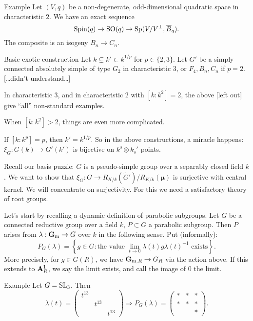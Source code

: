 \begin{enonce}[remark]{Example}
Let $(V,q)$ be a non-degenerate, odd-dimensional quadratic space in characteristic 
$2$. We have an exact sequence 
\[
  \operatorname{Spin}(q) \to \operatorname{SO}(q) \to \operatorname{Sp}(V/V^\bot,\overline B_q) .
\]
The composite is an isogeny $B_n \to C_n$. 
\end{enonce}

\begin{enonce}[remark]{Basic exotic construction}
Let $k\subsetneq k'\subset k^{1/p}$ for $p\in \{2,3\}$. Let 
$G'$ be a simply connected absolutely simple of type $G_2$ in characteristic $3$, 
or $F_4,B_n,C_n$ if $p=2$.
[\ldots didn't understand\ldots]
\end{enonce}

\begin{theo}
In characteristic $3$, and in characteristic $2$ with $[k:k^2]=2$, the above 
[left out] give ``all'' non-standard examples. 
\end{theo}


When $[k:k^2]>2$, things are even more complicated. 

If $[k:k^p]=p$, then $k'=k^{1/p}$. So in the above constructions, a miracle 
happens: $\xi_G:G(k) \to G'(k')$ is bijective on $k^s\otimes k_s'$-points. 

Recall our basis puzzle: $G$ is a pseudo-simple group over a separably closed 
field $k$. We want to show that  
$\xi_G:G\to R_{K/k}(\widetilde G')/R_{K/k}(\boldsymbol\mu)$ is surjective with 
central kernel. We will concentrate on surjectivity. For this we need a 
satisfactory theory of root groups. 

Let's start by recalling a dynamic definition of parabolic subgroups. Let $G$ 
be a connected reductive group over a field $k$, $P\subset G$ a parabolic 
subgroup. Then $P$ arises from $\lambda:\mathbf{G}_{\mathrm{m}} \to G$ over $k$ in the 
following sense. Put (informally): 
\[
  P_G(\lambda) = \left\{g\in G:\text{the value }\lim_{t\to 0} \lambda(t) g \lambda(t)^{-1}\text{ exists}\right\} .
\]
More precisely, for $g\in G(R)$, we have $\mathbf{G}_{\mathrm{m},R} \to G_R$ via the 
action above. If this extends to $\mathbf{A}_R^1$, we say the limit exists, and call 
the image of $0$ the limit. 

\begin{enonce}[remark]{Example}
Let $G=\operatorname{SL}_3$. Then 
\[
  \lambda(t) = \begin{pmatrix} t^{13} \\ & t^{13} \\ & & t^{13} \end{pmatrix}  \Rightarrow P_G(\lambda) = \begin{pmatrix}\ast & \ast & \ast \\ \ast & \ast & \ast \\ & & \ast \end{pmatrix} .
\]
\end{enonce}

